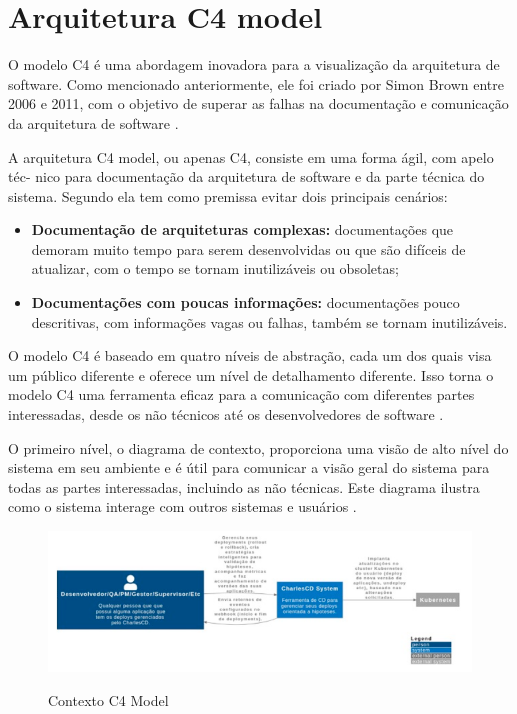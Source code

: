\section{Arquitetura C4 model}
O modelo C4 é uma abordagem inovadora para a visualização da arquitetura de software.
Como mencionado anteriormente, ele foi criado por Simon Brown entre 2006 e 2011, com
o objetivo de superar as falhas na documentação e comunicação da arquitetura de software \cite{Brown2020}.

A arquitetura C4 model, ou apenas C4, consiste em uma forma ágil, com apelo téc-
nico para documentação da arquitetura de software e da parte técnica do sistema.
Segundo \cite{Santana2021} ela tem como premissa evitar dois principais cenários:

\begin{itemize}
    \item \textbf{Documentação de arquiteturas complexas:} documentações que demoram muito tempo para serem desenvolvidas ou que são difíceis de atualizar, com o tempo se tornam inutilizáveis ou obsoletas;
    \item \textbf{Documentações com poucas informações:} documentações pouco descritivas, com informações vagas ou falhas, também se tornam inutilizáveis.
\end{itemize}

O modelo C4 é baseado em quatro níveis de abstração, cada um dos quais visa um
público diferente e oferece um nível de detalhamento diferente. Isso torna o modelo C4 uma
ferramenta eficaz para a comunicação com diferentes partes interessadas, desde os não técnicos até os desenvolvedores de software \cite{Santana2021}.

O primeiro nível, o diagrama de contexto, proporciona uma visão de alto nível do sistema
em seu ambiente e é útil para comunicar a visão geral do sistema para todas as partes interessadas,
incluindo as não técnicas.
Este diagrama ilustra como o sistema interage com outros sistemas e usuários \cite{Brown2020}.

\begin{figure}[!ht]
    \centering
    \caption{Contexto C4 Model}
    \includegraphics[scale=0.44]{assets/c4-context}
    \label{fig:c4-context}
    \tiny
    \sourcemedaddy
\end{figure}

